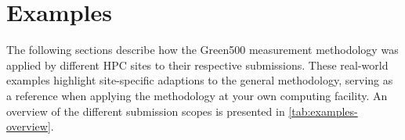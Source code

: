 \chapter{Examples}
\label{sec:examples}

The following sections describe how the Green500 measurement methodology was applied by different HPC sites to their respective submissions.
These real-world examples highlight site-specific adaptions to the general methodology, serving as a reference when applying the methodology at your own computing facility.
An overview of the different submission scopes is presented in \cref{tab:examples-overview}.

\begin{table}[h!]
    \centering
	\caption{Overview of Green500 submission examples from different sites and clusters.}
	\label{tab:examples-overview}
\end{table}


